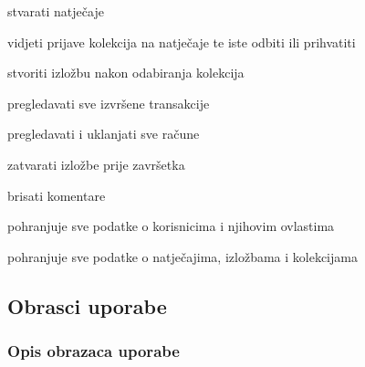 \begin{packed_enum}
\begin{packed_enum}
				\end{packed_enum}
				
				\item  {}
				
				\begin{packed_enum}
					
					\item stvarati natječaje
					\item vidjeti prijave kolekcija na natječaje te
					iste odbiti ili prihvatiti
					\item stvoriti izložbu nakon odabiranja kolekcija
					\item pregledavati sve izvršene transakcije
					\item pregledavati i uklanjati sve račune
					\item zatvarati izložbe prije završetka
					\item brisati komentare
					
				\end{packed_enum}
				
				\item  {}
				
				\begin{packed_enum}
					
					\item pohranjuje sve podatke o korisnicima i njihovim ovlastima
					\item pohranjuje sve podatke o natječajima, izložbama i kolekcijama
					
				\end{packed_enum}
			\end{packed_enum}
			
			\eject 
			
			
			
				
			\subsection{Obrasci uporabe}
				
				\subsubsection{Opis obrazaca uporabe}

